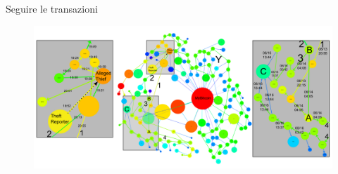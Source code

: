 \documentclass[italian]{beamer}
\begin{document}
\begin{frame}{Seguire le transazioni} %
\begin{figure}[htbp]
\centering
\includegraphics[width=\textwidth]{anonimato_1_13.PNG}
\end{figure}
\end{frame}




%
%
%
%
\end{document}
